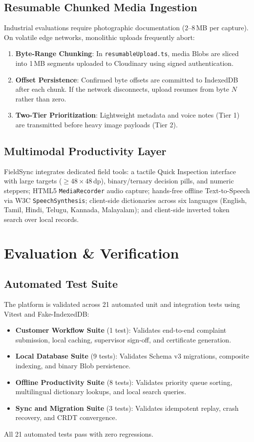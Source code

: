 \documentclass[conference]{IEEEtran}
\begin{document}
\subsection{Resumable Chunked Media Ingestion}
Industrial evaluations require photographic documentation ($2\text{--}8$\,MB per capture). On volatile edge networks, monolithic uploads frequently abort:
\begin{enumerate}\setlength{\itemsep}{1pt}
    \item \textbf{Byte-Range Chunking}: In \texttt{resumableUpload.ts}, media Blobs are sliced into 1\,MB segments uploaded to Cloudinary using signed authentication.
    \item \textbf{Offset Persistence}: Confirmed byte offsets are committed to IndexedDB after each chunk. If the network disconnects, upload resumes from byte $N$ rather than zero.
    \item \textbf{Two-Tier Prioritization}: Lightweight metadata and voice notes (Tier 1) are transmitted before heavy image payloads (Tier 2).
\end{enumerate}

\subsection{Multimodal Productivity Layer}
FieldSync integrates dedicated field tools: a tactile Quick Inspection interface with large targets ($\ge 48 \times 48$\,dp), binary/ternary decision pills, and numeric steppers; HTML5 \texttt{MediaRecorder} audio capture; hands-free offline Text-to-Speech via W3C \texttt{SpeechSynthesis}; client-side dictionaries across six languages (English, Tamil, Hindi, Telugu, Kannada, Malayalam); and client-side inverted token search over local records.

\section{Evaluation \& Verification}

\subsection{Automated Test Suite}
The platform is validated across 21 automated unit and integration tests using Vitest and Fake-IndexedDB:
\begin{itemize}\setlength{\itemsep}{1pt}
    \item \textbf{Customer Workflow Suite} (1 test): Validates end-to-end complaint submission, local caching, supervisor sign-off, and certificate generation.
    \item \textbf{Local Database Suite} (9 tests): Validates Schema v3 migrations, composite indexing, and binary Blob persistence.
    \item \textbf{Offline Productivity Suite} (8 tests): Validates priority queue sorting, multilingual dictionary lookups, and local search queries.
    \item \textbf{Sync and Migration Suite} (3 tests): Validates idempotent replay, crash recovery, and CRDT convergence.
\end{itemize}
All 21 automated tests pass with zero regressions.
\end{document}
